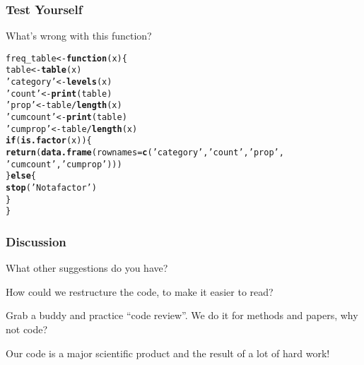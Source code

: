 \documentclass[12pt]{beamer}\usepackage[]{graphicx}\usepackage[]{color}
\makeatletter
\newcommand{\hlstr}[1]{\textcolor[rgb]{0.192,0.494,0.8}{#1}}%
\newcommand{\hlopt}[1]{\textcolor[rgb]{0,0,0}{#1}}%
\newcommand{\hlstd}[1]{\textcolor[rgb]{0.345,0.345,0.345}{#1}}%
\newcommand{\hlkwa}[1]{\textcolor[rgb]{0.161,0.373,0.58}{\textbf{#1}}}%
\newcommand{\hlkwb}[1]{\textcolor[rgb]{0.69,0.353,0.396}{#1}}%
\newcommand{\hlkwc}[1]{\textcolor[rgb]{0.333,0.667,0.333}{#1}}%
\newcommand{\hlkwd}[1]{\textcolor[rgb]{0.737,0.353,0.396}{\textbf{#1}}}%
\newenvironment{kframe}{%
 \def\at@end@of@kframe{}%
 \ifinner\ifhmode%
  \def\at@end@of@kframe{\end{minipage}}%
  \begin{minipage}{\columnwidth}%
 \fi\fi%
 \def\FrameCommand##1{\hskip\@totalleftmargin \hskip-\fboxsep
 \colorbox{shadecolor}{##1}\hskip-\fboxsep
     \hskip-\linewidth \hskip-\@totalleftmargin \hskip\columnwidth}%
 \MakeFramed {\advance\hsize-\width
   \@totalleftmargin\z@ \linewidth\hsize
   \@setminipage}}%
 {\par\unskip\endMakeFramed%
 \at@end@of@kframe}
\newenvironment{knitrout}{}{} %
\makeatother
\begin{document}

\begin{frame}[fragile]
\frametitle{Test Yourself}

What's wrong with this function?
\begin{knitrout}\footnotesize
{}\color{fgcolor}\begin{kframe}
\begin{alltt}
\hlstd{freq_table} \hlkwb{<-} \hlkwa{function}\hlstd{(}\hlkwc{x}\hlstd{) \{}
  \hlstd{table} \hlkwb{<-} \hlkwd{table}\hlstd{(x)}
  \hlstr{'category'} \hlkwb{<-} \hlkwd{levels}\hlstd{(x)}
  \hlstr{'count'} \hlkwb{<-} \hlkwd{print}\hlstd{(table)}
  \hlstr{'prop'} \hlkwb{<-} \hlstd{table}\hlopt{/}\hlkwd{length}\hlstd{(x)}
  \hlstr{'cumcount'} \hlkwb{<-} \hlkwd{print}\hlstd{(table)}
  \hlstr{'cumprop'} \hlkwb{<-} \hlstd{table}\hlopt{/}\hlkwd{length}\hlstd{(x)}
  \hlkwa{if}\hlstd{(}\hlkwd{is.factor}\hlstd{(x)) \{}
    \hlkwd{return}\hlstd{(}\hlkwd{data.frame}\hlstd{(}\hlkwc{rownames}\hlstd{=}\hlkwd{c}\hlstd{(}\hlstr{'category'}\hlstd{,} \hlstr{'count'}\hlstd{,}\hlstr{'prop'}\hlstd{,}
                                 \hlstr{'cumcount'}\hlstd{,}\hlstr{'cumprop'}\hlstd{)))}
  \hlstd{\}} \hlkwa{else} \hlstd{\{}
    \hlkwd{stop}\hlstd{(}\hlstr{'Not a factor'}\hlstd{)}
  \hlstd{\}}
\hlstd{\}}
\end{alltt}
\end{kframe}
\end{knitrout}

\end{frame}


\begin{frame}
\frametitle{Discussion}

\bbi
 \item What other suggestions do you have?
 \item How could we restructure the code, to make it easier to read?
 \item Grab a buddy and practice ``code review''. We do it for methods and papers, why not code? 
 \item Our code is a major scientific product and the result of a lot of hard work!
\ei

\end{frame}

\end{document}
